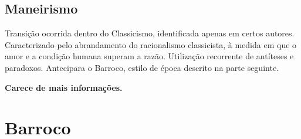 \documentclass[12pt]{book}
\begin{document}
 		\chapter{Maneirismo}
 		\par Transição ocorrida dentro do Classicismo, identificada apenas em certos autores. Caracterizado pelo abrandamento do racionalismo classicista, à medida em que o amor e a condição humana superam a razão. Utilização recorrente de antíteses e paradoxos. Antecipara o Barroco, estilo de época descrito na parte seguinte.
 		\par \textbf{Carece de mais informações.}
 			
 		\part{Barroco}
 			
\end{document}

